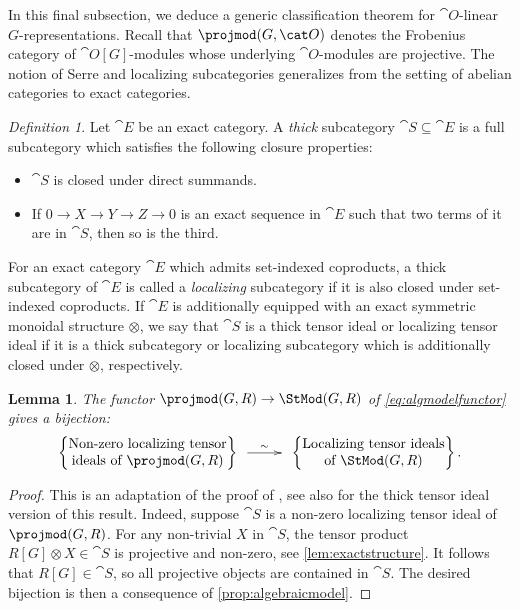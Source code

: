 \documentclass{amsart}%
\numberwithin{equation}{section}%
\newtheorem{Lem}[equation]{Lemma}
\theoremstyle{remark}
\newtheorem{Def}[equation]{Definition}
\begin{document}
In this final subsection, we deduce a generic classification theorem for $\cat O$-linear $G$-representations. Recall that $\projmod(G,\cat O)$ denotes the Frobenius category of $\cat O[G]$-modules whose underlying $\cat O$-modules are projective. The notion of Serre and localizing subcategories generalizes from the setting of abelian categories to exact categories.

\begin{Def}\label{def:exlocalizing}
Let $\cat E$ be an exact category. A \emph{thick} subcategory $\cat S \subseteq \cat E$ is a full subcategory which satisfies the following closure properties:
    \begin{itemize}
        \item $\cat S$ is closed under direct summands. 
        \item If $0\to X \to Y \to Z \to 0$ is an exact sequence in $\cat E$ such that two terms of it are in $\cat S$, then so is the third.  
    \end{itemize}
For an exact category $\cat E$ which admits set-indexed coproducts, a thick subcategory of $\cat E$ is called a \emph{localizing} subcategory if it is also closed under set-indexed coproducts. If $\cat E$ is additionally equipped with an exact symmetric monoidal structure $\otimes$, we say that $\cat S$ is a thick tensor ideal or localizing tensor ideal if it is a thick subcategory or localizing subcategory which is additionally closed under $\otimes$, respectively. 
\end{Def}

\begin{Lem}\label{lem:alglocalizingideals}
The functor $\projmod(G,R) \to \StMod(G,R)$ of \eqref{eq:algmodelfunctor} gives a bijection:
\[
\begin{Bmatrix}
\text{Non-zero localizing tensor} \\
\text{ideals of } \projmod(G,R)
\end{Bmatrix} 
\xymatrix@C=2pc{ \ar[r]^-{\sim} &}
\begin{Bmatrix}
\text{Localizing tensor ideals}  \\
\text{of } \StMod(G,R)
\end{Bmatrix}.
\]
\end{Lem}
\begin{proof}
This is an adaptation of the proof of \cite[Prop.~2.1]{BensonIyengarKrause11a}, see also \cite[Thm.~1]{krausestevenson_stablederived} for the thick tensor ideal version of this result. Indeed, suppose $\cat S$ is a non-zero localizing tensor ideal of $\projmod(G,R)$. For any non-trivial $X$ in $\cat S$, the tensor product $R[G] \otimes X \in \cat S$ is projective and non-zero, see \cref{lem:exactstructure}. It follows that $R[G] \in \cat S$, so all projective objects are contained in $\cat S$. The desired bijection is then a consequence of \cref{prop:algebraicmodel}.
\end{proof}
\end{document}
